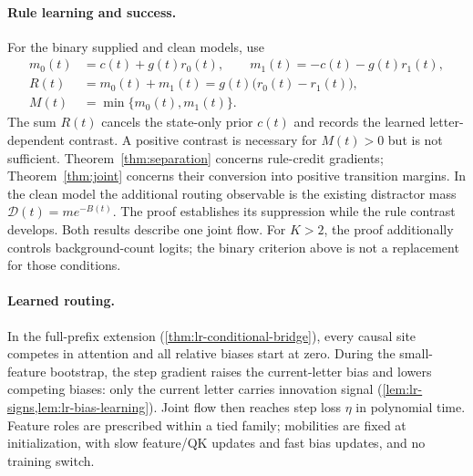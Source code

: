 \paragraph{Rule learning and success.}
For the binary supplied and clean models, use
\begin{equation}\label{eq:binary-rule-observables}
 \begin{aligned}
 m_0(t)&=c(t)+g(t)r_0(t),\qquad m_1(t)=-c(t)-g(t)r_1(t),\\
 R(t)&=m_0(t)+m_1(t)=g(t)\bigl(r_0(t)-r_1(t)\bigr),\\
 M(t)&=\min\{m_0(t),m_1(t)\}.
 \end{aligned}
\end{equation}
The sum $R(t)$ cancels the state-only prior $c(t)$ and records the learned
letter-dependent contrast. A positive contrast is necessary for $M(t)>0$
but is not sufficient. Theorem~\ref{thm:separation} concerns rule-credit gradients;
Theorem~\ref{thm:joint} concerns their conversion into positive transition margins.
In the clean model the additional routing observable is the existing distractor
mass $\mathcal D(t)=me^{-B(t)}$. The proof establishes its suppression while
the rule contrast develops. Both results describe one joint flow.
For $K>2$, the proof additionally controls background-count logits;
the binary criterion above is not a replacement for those conditions.

\paragraph{Learned routing.}
In the full-prefix extension (\cref{thm:lr-conditional-bridge}), every causal site competes in attention
and all relative biases start at zero. During the small-feature bootstrap, the step gradient raises
the current-letter bias and lowers competing biases: only the current letter carries innovation
signal (\cref{lem:lr-signs,lem:lr-bias-learning}). Joint flow then reaches step loss $\eta$ in
polynomial time. Feature roles are prescribed within a tied family; mobilities are fixed at
initialization, with slow feature/QK updates and fast bias updates, and no training switch.

